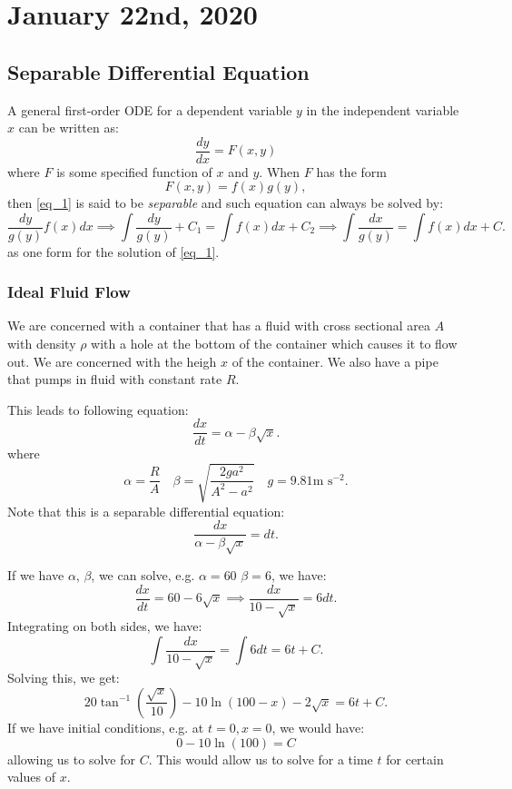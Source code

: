 \documentclass[../main/main.tex]{subfiles}
\begin{document}
\section{January 22nd, 2020}
\subsection{Separable Differential Equation}
A general first-order ODE for a dependent variable $y$ in the independent variable  $x$ can be written as:  
\begin{equation}
	\frac{dy}{dx}=F(x,y)
	\label{eq_1}
\end{equation} where $F$ is some specified function of  $x$ and  $y$. When  $F$ has the form
\begin{equation}
	F(x,y)=f(x)g(y),
\end{equation} then \ref{eq_1} is said to be \textit{separable} and such equation can always be solved by: \[
	\frac{dy}{g(y)} f(x)dx \implies \int\frac{dy}{g(y)}+C_1=\int f(x)dx+C_2 \implies \int \frac{dx}{g(y)} = \int f(x)dx+C
.\] as one form for the solution of \ref{eq_1}.
\subsubsection{Ideal Fluid Flow}
We are concerned with a container that has a fluid with cross sectional area $A$ with density  $\rho$ with a hole at the bottom of the container which causes it to flow out. We are concerned with the heigh  $x$ of the container. We also have a pipe that pumps in fluid with constant rate  $R$. 

This leads to following equation: \[
	\frac{dx}{dt} = \alpha-\beta\sqrt{x} 
.\]  where \[
\alpha = \frac{R}{A} \quad \beta = \sqrt{\frac{2ga^2}{A^2-a^2}} \quad g=9.81\text{m s}^{-2}
.\] Note that this is a separable differential equation: \[
\frac{dx}{\alpha-\beta\sqrt{x} } = dt
.\] 

If we have $\alpha$,  $\beta$, we can solve, e.g.  $\alpha=60$  $\beta=6$, we have:  \[
	\frac{dx}{dt} = 60-6\sqrt{x} \implies \frac{dx}{10-\sqrt{x} } = 6 dt
.\] Integrating on both sides, we have: \[
\int \frac{dx}{10-\sqrt{x} } = \int 6 dt = 6t+C
.\]  Solving this, we get: \[
20 \tan^{-1}\left( \frac{\sqrt{x}}{10}\right) -10\ln(100-x)-2\sqrt{x}=6t+C
.\] If we have initial conditions, e.g. at $t=0,x=0$, we would have:  \[
0-10\ln(100)=C
\] allowing us to solve for $C$. This would allow us to solve for a time $t$ for certain values of  $x$.
\end{document}
